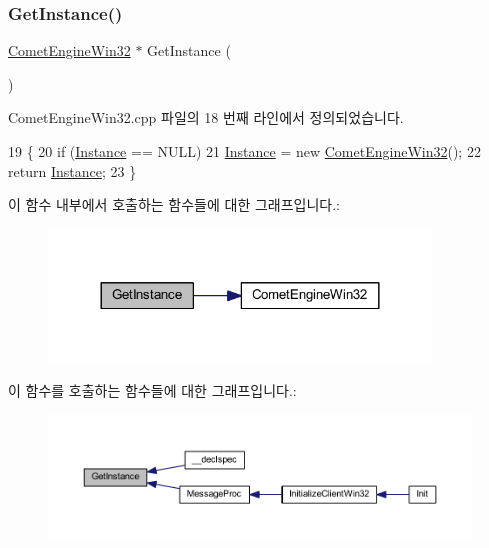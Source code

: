 \subsubsection{\texorpdfstring{Get\+Instance()}{GetInstance()}}
{\footnotesize\ttfamily \hyperlink{class_comet_engine_1_1_comet_engine_win32}{Comet\+Engine\+Win32} $\ast$ Get\+Instance (\begin{DoxyParamCaption}{ }\end{DoxyParamCaption})\hspace{0.3cm}{\ttfamily [static]}}



Comet\+Engine\+Win32.\+cpp 파일의 18 번째 라인에서 정의되었습니다.


\begin{DoxyCode}
19 \{
20     \textcolor{keywordflow}{if} (\hyperlink{class_comet_engine_1_1_comet_engine_win32_ac980c50873d6df828203b639e543de14}{Instance} == NULL)
21         \hyperlink{class_comet_engine_1_1_comet_engine_win32_ac980c50873d6df828203b639e543de14}{Instance} = \textcolor{keyword}{new} \hyperlink{class_comet_engine_1_1_comet_engine_win32_a62369ca325b16b42ad77a4f1523e4356}{CometEngineWin32}();
22     \textcolor{keywordflow}{return} \hyperlink{class_comet_engine_1_1_comet_engine_win32_ac980c50873d6df828203b639e543de14}{Instance};
23 \}
\end{DoxyCode}
이 함수 내부에서 호출하는 함수들에 대한 그래프입니다.\+:\nopagebreak
\begin{figure}[H]
\begin{center}
\leavevmode
\includegraphics[width=288pt]{class_comet_engine_1_1_comet_engine_win32_af96d04b2fa84467a5342e290690e40fb_cgraph}
\end{center}
\end{figure}
이 함수를 호출하는 함수들에 대한 그래프입니다.\+:\nopagebreak
\begin{figure}[H]
\begin{center}
\leavevmode
\includegraphics[width=350pt]{class_comet_engine_1_1_comet_engine_win32_af96d04b2fa84467a5342e290690e40fb_icgraph}
\end{center}
\end{figure}
\mbox{\label{class_comet_engine_1_1_comet_engine_win32_a1663bd9ecefc952f3f74065a592ad663}} 
